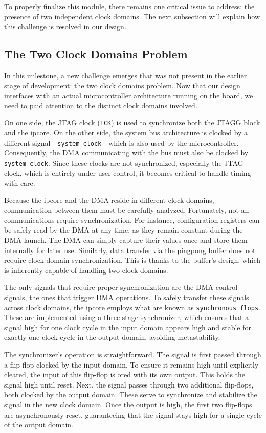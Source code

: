 \documentclass[a4paper,11pt,oneside]{report}
\begin{document}
To properly finalize this module, there remains one critical issue to address:
the presence of two independent clock domains. 
The next subsection will explain how this challenge is resolved in our design.

\subsection{The Two Clock Domains Problem}

In this milestone, a new challenge emerges that was not present in the earlier stage of development: the two clock domains problem. 
Now that our design interfaces with an actual microcontroller architecture running on the board, 
we need to paid attention to the distinct clock domains involved.

On one side, the JTAG clock (\texttt{TCK}) is used to synchronize both the JTAGG block and the ipcore. 
On the other side, the system bus architecture is clocked by a different signal—\texttt{system\_clock}—which is also used by the microcontroller. 
Consequently, the DMA communicating with the bus must also be clocked by \texttt{system\_clock}. 
Since these clocks are not synchronized, especially the JTAG clock, which is entirely under user control, it becomes critical to handle timing with care.

Because the ipcore and the DMA reside in different clock domains, communication between them must be carefully analyzed. 
Fortunately, not all communications require synchronization. For instance, configuration registers can be safely read by the DMA at any time, 
as they remain constant during the DMA launch. The DMA can simply capture their values once and store them internally for later use.
Similarly, data transfer via the pingpong buffer does not require clock domain synchronization. 
This is thanks to the buffer's design, which is inherently capable of handling two clock domains.

The only signals that require proper synchronization are the DMA control signals, the ones that trigger DMA operations. 
To safely transfer these signals across clock domains, the ipcore employs what are known as \texttt{synchronous flops}. 
These are implemented using a three-stage synchronizer, which ensures that a signal high for one clock cycle in the input domain 
appears high and stable for exactly one clock cycle in the output domain, avoiding metastability.

The synchronizer's operation is straightforward. The signal is first passed through a flip-flop clocked by the input domain. 
To ensure it remains high until explicitly cleared, the input of this flip-flop is ored with its own output. 
This holds the signal high until reset.
Next, the signal passes through two additional flip-flops, both clocked by the output domain. 
These serve to synchronize and stabilize the signal in the new clock domain. 
Once the output is high, the first two flip-flops are asynchronously reset, 
guaranteeing that the signal stays high for a single cycle of the output domain.
\end{document}
